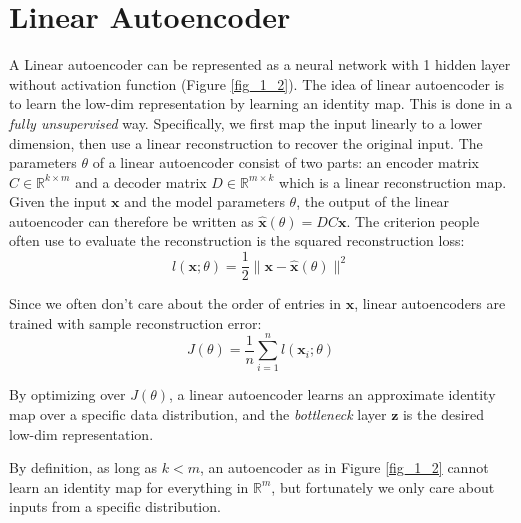 \documentclass[../book-template.tex]{subfiles}
\begin{document}
\section{Linear Autoencoder}
A Linear autoencoder can be represented as a neural network with 1 hidden layer without activation function (Figure \ref{fig_1_2}). The idea of linear autoencoder is to learn the low-dim representation by learning an identity map. This is done in a \emph{fully unsupervised} way. Specifically, we first map the input linearly to a lower dimension, then use a linear reconstruction to recover the original input. The parameters $\theta$ of a linear autoencoder consist of two parts: an encoder matrix $C\in \mathbb{R}^{k\times m}$ and a decoder matrix $D\in \mathbb{R}^{m\times k}$ which is a linear reconstruction map. Given the input $\bm{x}$ and the model parameters $\theta$, the output of the linear autoencoder can therefore be written as $\hat{\bm{x}}(\theta)=DC\bm{x}$. The criterion people often use to evaluate the reconstruction is the squared reconstruction loss:
\begin{equation*}
    l(\bm{x};\theta)=\frac{1}{2}\|\bm{x}-\hat{\bm{x}}(\theta)\|^2
\end{equation*}
\par Since we often don't care about the order of entries in $\bm{x}$, linear autoencoders are trained with sample reconstruction error:
\begin{equation*}
    J(\theta)=\frac{1}{n}\sum_{i=1}^{n}l(\bm{x}_i;\theta)
\end{equation*}
\par By optimizing over $J(\theta)$, a linear autoencoder learns an approximate identity map over a specific data distribution, and the \emph{bottleneck} layer $\bm{z}$ is the desired low-dim representation.

\begin{remark}
By definition, as long as $k<m$, an autoencoder as in Figure \ref{fig_1_2} cannot learn an identity map for everything in $\mathbb{R}^m$, but fortunately we only care about inputs from a specific distribution. 
\end{remark}
\end{document}
